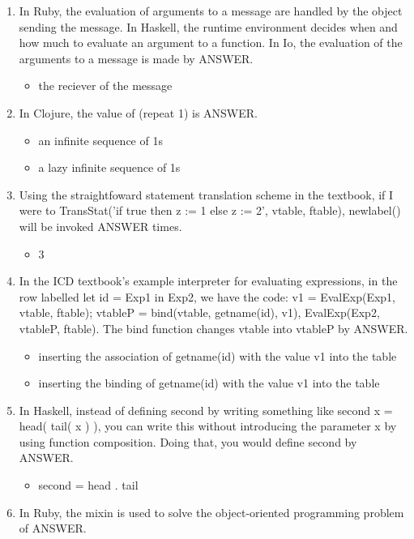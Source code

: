 \documentclass{exam}
\begin{document}
\begin{enumerate}
\item In Ruby, the evaluation of arguments to a message are handled by the object sending the message.  In Haskell, the runtime environment decides when and how much to evaluate an argument to a function.  In Io, the evaluation of the arguments to a message is made by ANSWER.
\begin{itemize}
\item the reciever of the message
\end{itemize}
\item In Clojure, the value of (repeat 1) is ANSWER.
\begin{itemize}
\item an infinite sequence of 1s
\item a lazy infinite sequence of 1s
\end{itemize}
\item Using the straightfoward statement translation scheme in the textbook, if I were to TransStat('if true then z := 1 else z := 2', vtable, ftable), newlabel() will be invoked ANSWER times.
\begin{itemize}
\item 3
\end{itemize}
\item In the ICD textbook's example interpreter for evaluating expressions, in the row labelled let id = Exp1 in Exp2, we have the code: v1 = EvalExp(Exp1, vtable, ftable); vtableP = bind(vtable, getname(id), v1), EvalExp(Exp2, vtableP, ftable).  The bind function changes vtable into vtableP by ANSWER.
\begin{itemize}
\item inserting the association of getname(id) with the value v1 into the table
\item inserting the binding of getname(id) with the value v1 into the table
\end{itemize}
\item In Haskell, instead of defining second by writing something like second x = head( tail(  x ) ), you can write this without introducing the parameter x by using function composition.  Doing that, you would define second by ANSWER.
\begin{itemize}
\item second = head . tail
\end{itemize}
\item In Ruby, the mixin is used to solve the object-oriented programming problem of ANSWER.
\begin{itemize}

\end{itemize}
\end{enumerate}
\end{document}
